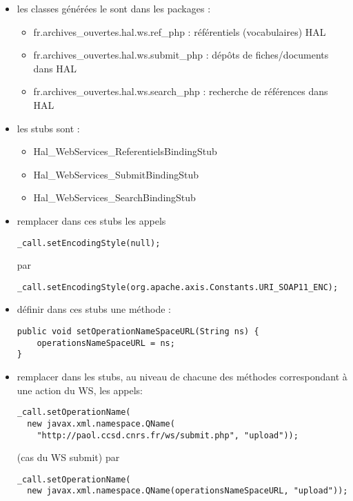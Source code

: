 \documentclass[11pt]{article}
\begin{document}
\begin{itemize}
\item les classes générées le sont dans les packages :

\begin{itemize}
\item fr.archives\_{}ouvertes.hal.ws.ref\_{}php : référentiels (vocabulaires) HAL
\item fr.archives\_{}ouvertes.hal.ws.submit\_{}php : dépôts de fiches/documents dans HAL
\item fr.archives\_{}ouvertes.hal.ws.search\_{}php : recherche de références dans HAL
\end{itemize}

\item les stubs sont :

\begin{itemize}
\item Hal\_{}WebServices\_{}ReferentielsBindingStub
\item Hal\_{}WebServices\_{}SubmitBindingStub
\item Hal\_{}WebServices\_{}SearchBindingStub
\end{itemize}

\item remplacer dans ces stubs les appels

\begin{verbatim}
_call.setEncodingStyle(null);
\end{verbatim}


    par

\begin{verbatim}
_call.setEncodingStyle(org.apache.axis.Constants.URI_SOAP11_ENC);
\end{verbatim}
\item définir dans ces stubs une méthode :

\begin{verbatim}
public void setOperationNameSpaceURL(String ns) {
    operationsNameSpaceURL = ns;
}
\end{verbatim}
\item remplacer dans les stubs, au niveau de chacune des méthodes correspondant à une action du WS, les appels:

\begin{verbatim}
_call.setOperationName(
  new javax.xml.namespace.QName(
    "http://paol.ccsd.cnrs.fr/ws/submit.php", "upload"));
\end{verbatim}


    (cas du WS submit)
    par

\begin{verbatim}
_call.setOperationName(
  new javax.xml.namespace.QName(operationsNameSpaceURL, "upload"));
\end{verbatim}
\end{itemize}
\end{document}
